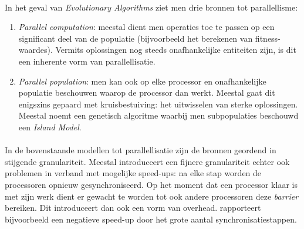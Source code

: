 \paragraph{}
In het geval van \emph{Evolutionary Algorithms} ziet men drie bronnen tot parallellisme:
\begin{enumerate}
 \item \emph{Parallel computation}: meestal dient men operaties toe te passen op een significant deel van de populatie (bijvoorbeeld het berekenen van fitness-waardes). Vermits oplossingen nog steeds onafhankelijke entiteiten zijn, is dit een inherente vorm van parallellisatie.
 \item \emph{Parallel population}: men kan ook op elke processor en onafhankelijke populatie beschouwen waarop de processor dan werkt. Meestal gaat dit enigszins gepaard met kruisbestuiving: het uitwisselen van sterke oplossingen. Meestal noemt een genetisch algoritme waarbij men subpopulaties beschouwd een \emph{Island Model}\cite{islandModel}.
\end{enumerate}

\paragraph{}
In de bovenstaande modellen tot parallellisatie zijn de bronnen geordend in stijgende granulariteit. Meestal introduceert een fijnere granulariteit echter ook problemen in verband met mogelijke speed-ups: na elke stap worden de processoren opnieuw gesynchroniseerd. Op het moment dat een processor klaar is met zijn werk dient er gewacht te worden tot ook andere processoren deze \emph{barrier} bereiken. Dit introduceert dan ook een vorm van overhead. \cite{conf/glvlsi/HaldarNCB00} rapporteert bijvoorbeeld een negatieve speed-up door het grote aantal synchronisatiestappen.

